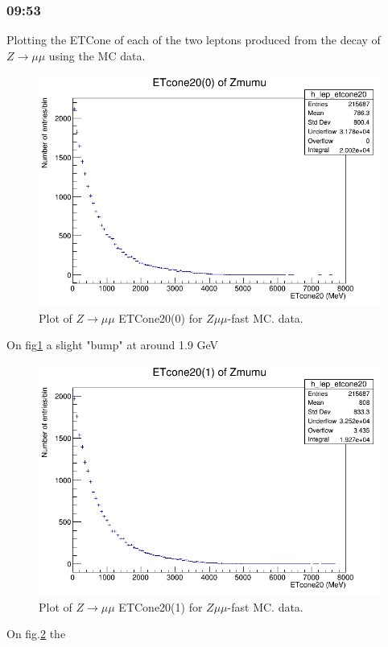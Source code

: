 \subsubsection*{09:53}
Plotting the ETCone of each of the two leptons produced from the decay of $Z \rightarrow \mu \mu$ using the MC data.
\begin{figure}[h!]
    \centering
    \includegraphics[width=0.85\linewidth]{plots/16-02-2021/Zmumu-fast_ETcone(0)_0-8GeV_16-02-21_09-54.png}
    \caption{Plot of  $Z \rightarrow \mu\mu$ ETCone20(0) for $Z\mu\mu$-fast MC.  data.}\label{fig:Zmumu-fast_ETcone(0)_0-8GeV_16-02-21_09-54}
\end{figure}
On fig\ref{fig:Zmumu-fast_ETcone(0)_0-8GeV_16-02-21_09-54} a slight "bump" at around 1.9 GeV

\begin{figure}[h!]
    \centering
    \includegraphics[width=0.85\linewidth]{plots/16-02-2021/Zmumu-fast_ETcone(1)_0-8GeV_16-02-21_09-56.png}
    \caption{Plot of  $Z \rightarrow \mu\mu$ ETCone20(1) for $Z\mu\mu$-fast MC.  data.}\label{fig:Zmumu-fast_ETcone(1)_0-8GeV_16-02-21_09-56}
\end{figure}
On fig.\ref{fig:Zmumu-fast_ETcone(1)_0-8GeV_16-02-21_09-56} the

